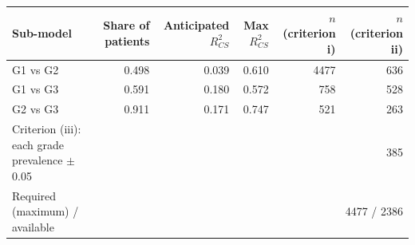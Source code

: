 \begin{tabular}{lrrrrr}
\toprule
Sub-model & Share of patients & Anticipated $R^2_{CS}$ & Max $R^2_{CS}$ & $n$ (criterion i) & $n$ (criterion ii) \\
\midrule
G1 vs G2 & 0.498 & 0.039 & 0.610 & 4477 & 636 \\
G1 vs G3 & 0.591 & 0.180 & 0.572 & 758 & 528 \\
G2 vs G3 & 0.911 & 0.171 & 0.747 & 521 & 263 \\
\midrule
Criterion (iii): each grade prevalence $\pm$0.05 & & & & \multicolumn{2}{r}{385} \\
Required (maximum) / available & & & & \multicolumn{2}{r}{4477 / 2386} \\
\bottomrule
\end{tabular}